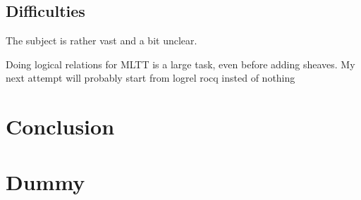 \documentclass{article}
\newcommand{\0}{\mathbf{0}}
\newcommand{\1}{\mathbf{1}}
\begin{document}
\subsection{Difficulties}

The subject is rather vast and a bit unclear.

Doing logical relations for MLTT is a large task, even before adding sheaves. My next attempt will probably start from logrel rocq insted of nothing


\section{Conclusion}



\newpage

\appendix
\appendixname

\section{Dummy}

\printbibliography
\end{document}
